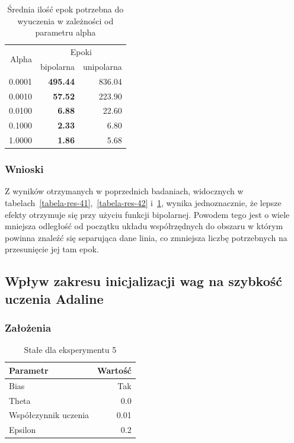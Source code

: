 \documentclass{article}
\begin{document}
\begin{table}[!h]
	\caption{Średnia ilość epok potrzebna do wyuczenia w zależności od parametru alpha}
	\label{tabela-res-43}
	\centering
	\begin{tabular}{rrr}
		\toprule
		\multirow{2}{*}{Alpha}   & \multicolumn{2}{c}{Epoki} \\
		       & bipolarna       & unipolarna \\
		\midrule
		0.0001 & \textbf{495.44} & 836.04     \\
		0.0010 & \textbf{57.52}  & 223.90     \\
		0.0100 & \textbf{6.88}   & 22.60      \\
		0.1000 & \textbf{2.33}   & 6.80       \\
		1.0000 & \textbf{1.86}   & 5.68       \\
		\bottomrule
	\end{tabular}
\end{table}

\subsubsection*{Wnioski}

Z wyników otrzymanych w poprzednich badaniach, widocznych w tabelach~\ref{tabela-res-41},~\ref{tabela-res-42} i~\ref{tabela-res-43}, wynika jednoznacznie, że lepsze efekty otrzymuje się przy użyciu funkcji bipolarnej. Powodem tego jest o wiele mniejsza odległość od początku układu współrzędnych do obszaru w którym powinna znaleźć się separująca dane linia, co zmniejsza liczbę potrzebnych na przesunięcie jej tam epok. 

\newpage
\subsection{Wpływ zakresu inicjalizacji wag na szybkość uczenia Adaline}
\subsubsection*{Założenia}
\begin{table}[!h]
	\caption{Stałe dla eksperymentu 5}
	\label{tabela-const-5}
	\centering
	\begin{tabular}{lr}
		\toprule
		Parametr               & Wartość \\
		\midrule
		Bias                   & Tak       \\
		Theta                  & 0.0       \\
		Współczynnik uczenia & 0.01      \\
		Epsilon                & 0.2       \\
		\bottomrule
	\end{tabular}
\end{table}
\end{document}
